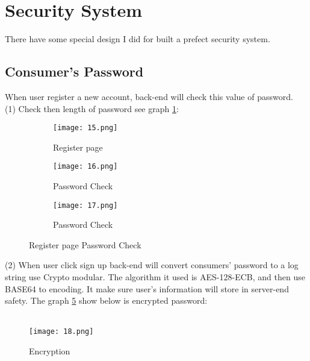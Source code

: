 \section{Security System}
There have some special design I did for built a prefect security system.
\subsection{Consumer's Password}
	When user register a new account, back-end will check this value of password.\\
 (1)	Check then length of password see graph \ref{fig:a cubed graph}:\\
 \begin{figure}
 	\centering
	 \begin{subfigure}[h]{0.3\textwidth}
	 	\centering
	 	\texttt{[image: 15.png]}
	 	\caption{Register page}
	 	\label{fig:a cubed graph}
	 \end{subfigure}
 	\hfill
	 \begin{subfigure}[h]{0.3\textwidth}
	 	\centering
	 	\texttt{[image: 16.png]}
	 	\caption{Password Check}
	 	\label{fig:c cubed graph}
	 \end{subfigure}	
 	\hfill
	 	\begin{subfigure}[h]{0.3\textwidth}
	 		\centering
	 		\texttt{[image: 17.png]}
	 		\caption{Password Check}
	 		\label{fig:d cubed graph}
	 	\end{subfigure}
 	\caption{Register page Password Check}
 	\label{fig:ss graphs}
 \end{figure}
 
 (2) When user click sign up back-end will convert consumers' password to a log string use Crypto modular. The algorithm it used is AES-128-ECB, and then use BASE64 to encoding. It make sure user's information will store in server-end safety. The graph \ref{fig:7 cubed graph} show below is encrypted password:\\
 \\
 \begin{figure}[h]
 	\centering
 	\texttt{[image: 18.png]}
 	\caption{Encryption}
 	\label{fig:7 cubed graph}
 \end{figure}
 \\
